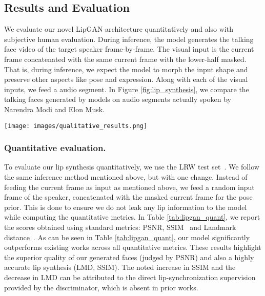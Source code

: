 \documentclass[sigconf]{acmart}
\begin{document}
\subsection{Results and Evaluation}
We evaluate our novel LipGAN architecture quantitatively and also with subjective human evaluation. During inference, the model generates the talking face video of the target speaker frame-by-frame. The visual input is the current frame concatenated with the same current frame with the lower-half masked. That is, during inference, we expect the model to morph the input shape and preserve other aspects like pose and expression. Along with each of the visual inputs, we feed a  audio segment. In Figure \ref{fig:lip_synthesis}, we compare the talking faces generated by  models on audio segments actually spoken by Narendra Modi and Elon Musk.

\begin{figure*}[h]
  \texttt{[image: images/qualitative\_results.png]}
  \caption{Visual comparison of faces generated by different models when they try to speak specific segments of the words shown in the last row. The audio segments corresponding to these word segments are extracted from the guiding video and fed into each of the models compared above. From top to bottom row: (a) ~\citet{zhou2018talking} (b) ~\citet{chung2017you} and Our LipGAN model. While (a) achieves poor lipsync across languages, and (b) generates unnatural lip movements, our LipGAN model produces consistent accurate, natural talking faces across languages.}
\label{fig:lip_synthesis}
\end{figure*}

\subsubsection{Quantitative evaluation.}To evaluate our lip synthesis quantitatively, we use the LRW test set~\cite{chung2016lip}. We follow the same inference method mentioned above, but with one change. Instead of feeding the current frame as input as mentioned above, we feed a random input frame of the speaker, concatenated with the masked current frame for the pose prior. This is done to ensure we do not leak any lip information to the model while computing the quantitative metrics. In Table \ref{tab:lipgan_quant}, we report the scores obtained using standard metrics: PSNR, SSIM~\cite{wang2004image} and Landmark distance~\cite{chen2018lip}. As can be seen in Table \ref{tab:lipgan_quant}, our model significantly outperforms existing works across all quantitative metrics. These results highlight the superior quality of our generated faces (judged by PSNR) and also a highly accurate lip synthesis (LMD, SSIM). The noted increase in SSIM and the decrease in LMD can be attributed to the direct lip-synchronization supervision provided by the discriminator, which is absent in prior works.
\end{document}
